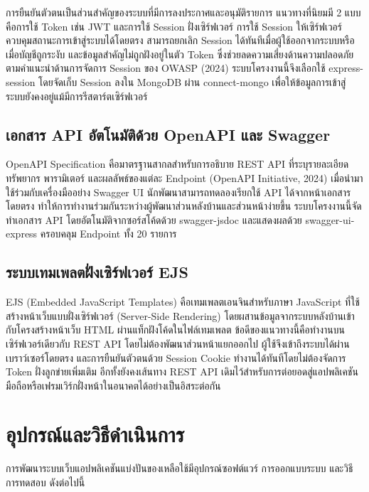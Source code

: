 \documentclass[12pt,a4paper]{report}
\begin{document}
การยืนยันตัวตนเป็นส่วนสำคัญของระบบที่มีการลงประกาศและอนุมัติรายการ แนวทางที่นิยมมี 2 แบบ คือการใช้ Token เช่น JWT และการใช้ Session ฝั่งเซิร์ฟเวอร์ การใช้ Session ให้เซิร์ฟเวอร์ควบคุมสถานะการเข้าสู่ระบบได้โดยตรง สามารถยกเลิก Session ได้ทันทีเมื่อผู้ใช้ออกจากระบบหรือเมื่อบัญชีถูกระงับ และข้อมูลสำคัญไม่ถูกฝังอยู่ในตัว Token ซึ่งช่วยลดความเสี่ยงด้านความปลอดภัย ตามคำแนะนำด้านการจัดการ Session ของ OWASP (2024) ระบบโครงงานนี้จึงเลือกใช้ express-session โดยจัดเก็บ Session ลงใน MongoDB ผ่าน connect-mongo เพื่อให้ข้อมูลการเข้าสู่ระบบยังคงอยู่แม้มีการรีสตาร์ตเซิร์ฟเวอร์

\section{เอกสาร API อัตโนมัติด้วย OpenAPI และ Swagger}

OpenAPI Specification คือมาตรฐานสากลสำหรับการอธิบาย REST API ที่ระบุรายละเอียดทรัพยากร พารามิเตอร์ และผลลัพธ์ของแต่ละ Endpoint (OpenAPI Initiative, 2024) เมื่อนำมาใช้ร่วมกับเครื่องมืออย่าง Swagger UI นักพัฒนาสามารถทดลองเรียกใช้ API ได้จากหน้าเอกสารโดยตรง ทำให้การทำงานร่วมกันระหว่างผู้พัฒนาส่วนหลังบ้านและส่วนหน้าง่ายขึ้น ระบบโครงงานนี้จัดทำเอกสาร API โดยอัตโนมัติจากซอร์สโค้ดด้วย swagger-jsdoc และแสดงผลด้วย swagger-ui-express ครอบคลุม Endpoint ทั้ง 20 รายการ

\section{ระบบเทมเพลตฝั่งเซิร์ฟเวอร์ EJS}

EJS (Embedded JavaScript Templates) คือเทมเพลตเอนจินสำหรับภาษา JavaScript ที่ใช้สร้างหน้าเว็บแบบฝั่งเซิร์ฟเวอร์ (Server-Side Rendering) โดยผสานข้อมูลจากระบบหลังบ้านเข้ากับโครงสร้างหน้าเว็บ HTML ผ่านแท็กฝังโค้ดในไฟล์เทมเพลต ข้อดีของแนวทางนี้คือทำงานบนเซิร์ฟเวอร์เดียวกับ REST API โดยไม่ต้องพัฒนาส่วนหน้าแยกออกไป ผู้ใช้จึงเข้าถึงระบบได้ผ่านเบราว์เซอร์โดยตรง และการยืนยันตัวตนด้วย Session Cookie ทำงานได้ทันทีโดยไม่ต้องจัดการ Token ฝั่งลูกข่ายเพิ่มเติม อีกทั้งยังคงเส้นทาง REST API เดิมไว้สำหรับการต่อยอดสู่แอปพลิเคชันมือถือหรือเฟรมเวิร์กฝั่งหน้าในอนาคตได้อย่างเป็นอิสระต่อกัน

\chapter{อุปกรณ์และวิธีดำเนินการ}

การพัฒนาระบบเว็บแอปพลิเคชันแบ่งปันของเหลือใช้มีอุปกรณ์ซอฟต์แวร์ การออกแบบระบบ และวิธีการทดสอบ ดังต่อไปนี้
\end{document}
